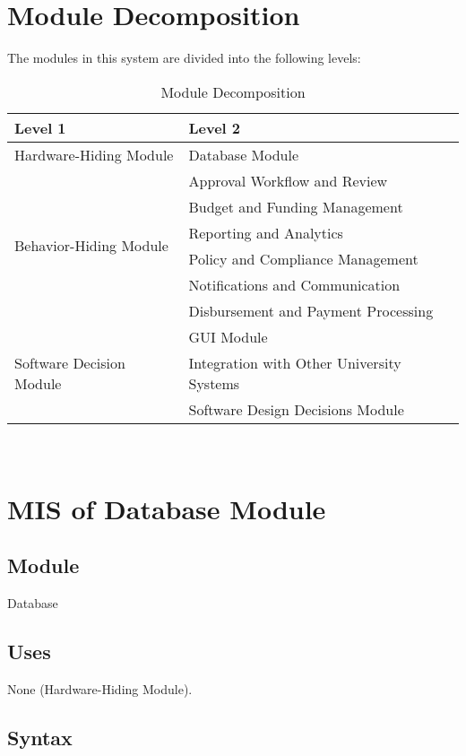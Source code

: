 \documentclass[12pt, titlepage]{article}
\begin{document}
\section{Module Decomposition}
The modules in this system are divided into the following levels:

\begin{table}[h!]
    \centering
    \begin{tabular}{p{} p{}}
        \toprule
        \textbf{Level 1} & \textbf{Level 2} \\
        \midrule
        Hardware-Hiding Module & Database Module \\
        \midrule
        \multirow{6}{0.3\textwidth}{Behavior-Hiding Module} & Approval Workflow and Review \\
        & Budget and Funding Management \\
        & Reporting and Analytics \\
        & Policy and Compliance Management \\
        & Notifications and Communication \\
        & Disbursement and Payment Processing \\
        \midrule
        \multirow{3}{0.3\textwidth}{Software Decision Module} & GUI Module \\
        & Integration with Other University Systems \\
        & Software Design Decisions Module \\
        \bottomrule
    \end{tabular}
    \caption{Module Decomposition}
    \label{tab:module_decomposition}
\end{table}

\newpage
~\newpage

\section{MIS of Database Module}

\subsection{Module}
Database

\subsection{Uses}
None (Hardware-Hiding Module).

\subsection{Syntax}
\end{document}
